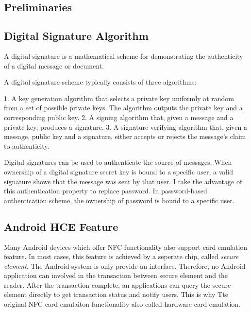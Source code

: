 \begin{CJK}{Bg5}{bsmi}


\chapter{Preliminaries}

\section{Digital Signature Algorithm}

A digital signature is a mathematical scheme for demonstrating the authenticity of a digital message or document. 

A digital signature scheme typically consists of three algorithms:

1. A key generation algorithm that selects a private key uniformly at random from a set of possible private keys. The algorithm outputs the private key and a corresponding public key.
2. A signing algorithm that, given a message and a private key, produces a signature.
3. A signature verifying algorithm that, given a message, public key and a signature, either accepts or rejects the message's claim to authenticity.

Digital signatures can be used to authenticate the source of messages. When ownership of a digital signature secret key is bound to a specific user, a valid signature shows that the message was sent by that user. I take the advantage of this authentication property to replace password. In password-based authentication scheme, the ownership of password is bound to a specific user. 

\section{Android HCE Feature}

Many Android devices which offer NFC functionality also support card emulation feature. In most cases, this feature is achieved by a seperate chip, called \emph{secure element}. The Android system is only provide an interface. Therefore, no Android application can involved in the transaction between secure element and the reader. After the transaction complete, an applications can query the secure element directly to get transaction status and notify users. This is why Tte original NFC card emulaiton functionality also called hardware card emulation.


\end{CJK}
